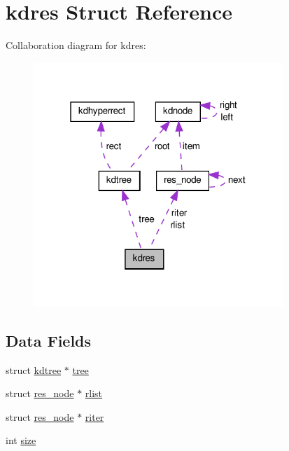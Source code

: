\hypertarget{a00010}{\section{kdres \-Struct \-Reference}
\label{d7/dec/a00010}
}


\-Collaboration diagram for kdres\-:
\nopagebreak
\begin{figure}[H]
\begin{center}
\leavevmode
\includegraphics[width=268pt]{d3/de7/a00039}
\end{center}
\end{figure}
\subsection*{\-Data \-Fields}
\begin{DoxyCompactItemize}
\item 
struct \hyperlink{a00011}{kdtree} $\ast$ \hyperlink{a00010_ae75a12d07763fe14039f5123e1e3d377_ae75a12d07763fe14039f5123e1e3d377}{tree}
\item 
struct \hyperlink{a00012}{res\-\_\-node} $\ast$ \hyperlink{a00010_a1424ef73f7eb289a18a4ce40ac38dedb_a1424ef73f7eb289a18a4ce40ac38dedb}{rlist}
\item 
struct \hyperlink{a00012}{res\-\_\-node} $\ast$ \hyperlink{a00010_a10ec50599e37f9fcb520b8fc6d44728b_a10ec50599e37f9fcb520b8fc6d44728b}{riter}
\item 
int \hyperlink{a00010_a439227feff9d7f55384e8780cfc2eb82_a439227feff9d7f55384e8780cfc2eb82}{size}
\end{DoxyCompactItemize}


